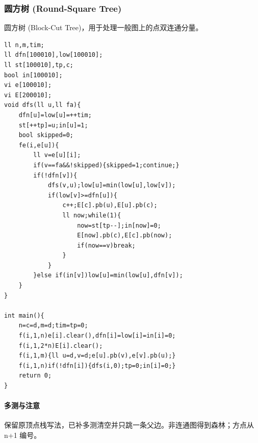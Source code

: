 \subsubsection{圆方树 (Round-Square Tree)}
圆方树 (Block-Cut Tree)，用于处理一般图上的点双连通分量。
\begin{lstlisting}
ll n,m,tim;
ll dfn[100010],low[100010];
ll st[100010],tp,c;
bool in[100010];
vi e[100010];
vi E[200010];
void dfs(ll u,ll fa){
	dfn[u]=low[u]=++tim;
	st[++tp]=u;in[u]=1;
	bool skipped=0;
	fe(i,e[u]){
		ll v=e[u][i];
        if(v==fa&&!skipped){skipped=1;continue;}
		if(!dfn[v]){
			dfs(v,u);low[u]=min(low[u],low[v]);
			if(low[v]>=dfn[u]){
				c++;E[c].pb(u),E[u].pb(c);
				ll now;while(1){
					now=st[tp--];in[now]=0;
					E[now].pb(c),E[c].pb(now);
					if(now==v)break;
				}
			}
		}else if(in[v])low[u]=min(low[u],dfn[v]);
	}
}

int main(){
	n=c=d,m=d;tim=tp=0;
    f(i,1,n)e[i].clear(),dfn[i]=low[i]=in[i]=0;
    f(i,1,2*n)E[i].clear();
	f(i,1,m){ll u=d,v=d;e[u].pb(v),e[v].pb(u);}
	f(i,1,n)if(!dfn[i]){dfs(i,0);tp=0;in[i]=0;}
	return 0;
}
\end{lstlisting}

\paragraph{多测与注意} 保留原顶点栈写法，已补多测清空并只跳一条父边。非连通图得到森林；方点从 n+1 编号。
